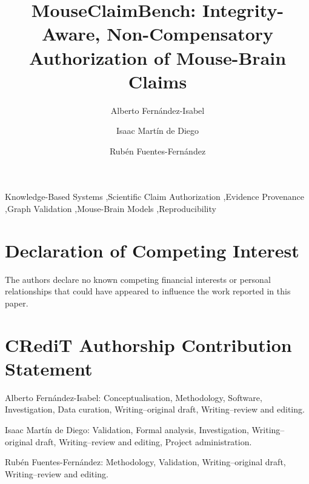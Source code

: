 \documentclass[review,12pt]{elsarticle}
\begin{document}
\begin{frontmatter}

\title{MouseClaimBench: Integrity-Aware, Non-Compensatory Authorization of Mouse-Brain Claims}

\author[urjc]{Alberto Fern\'andez-Isabel}
\author[urjc]{Isaac Mart\'in de Diego}
\author[ucm]{Rub\'en Fuentes-Fern\'andez}


\begin{abstract}

\end{abstract}

\begin{keyword}
Knowledge-Based Systems \sep Scientific Claim Authorization \sep Evidence Provenance \sep Graph Validation \sep Mouse-Brain Models \sep Reproducibility
\end{keyword}

\end{frontmatter}

\linenumbers
\acresetall








\section*{Declaration of Competing Interest}
\label{sec:competing-interest}
The authors declare no known competing financial interests or personal relationships that could have appeared to influence the work reported in this paper.

\section*{CRediT Authorship Contribution Statement}
\label{sec:credit}
\noindent Alberto Fern\'andez-Isabel: Conceptualisation, Methodology, Software, Investigation, Data curation, Writing--original draft, Writing--review and editing.\par
\noindent Isaac Mart\'in de Diego: Validation, Formal analysis, Investigation, Writing--original draft, Writing--review and editing, Project administration.\par
\noindent Rub\'en Fuentes-Fern\'andez: Methodology, Validation, Writing--original draft, Writing--review and editing.
\end{document}

